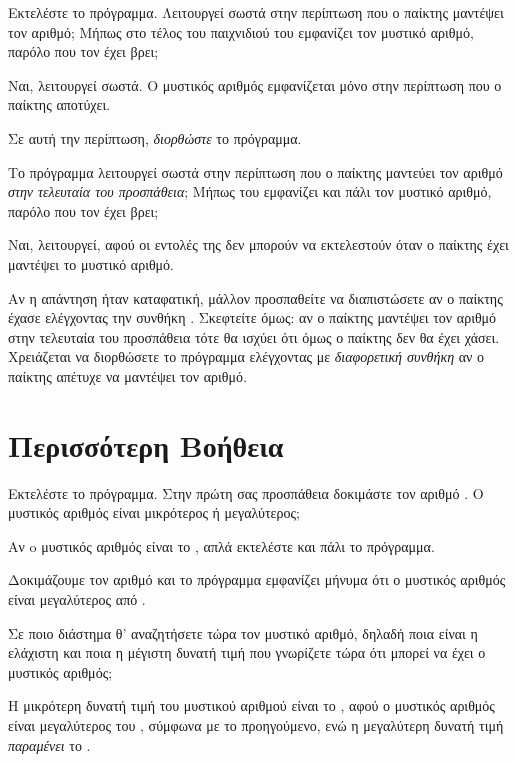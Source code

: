 \documentclass[a4paper,11pt,oneside]{book}
\begin{document}
\begin{step}
Εκτελέστε το πρόγραμμα. Λειτουργεί σωστά στην περίπτωση που ο παίκτης μαντέψει τον αριθμό; Μήπως στο τέλος του παιχνιδιού του εμφανίζει τον μυστικό αριθμό, παρόλο που τον έχει βρει;

\begin{answer}
	Ναι, λειτουργεί σωστά. Ο μυστικός αριθμός εμφανίζεται μόνο στην περίπτωση που ο παίκτης αποτύχει.
\end{answer}

Σε αυτή την περίπτωση, \emph{διορθώστε} το πρόγραμμα.

Tο πρόγραμμα λειτουργεί σωστά στην περίπτωση που ο παίκτης μαντεύει τον αριθμό \emph{στην τελευταία του προσπάθεια}; Μήπως του εμφανίζει και πάλι τον μυστικό αριθμό, παρόλο που τον έχει βρει;

\begin{answer}
	Ναι, λειτουργεί, αφού οι εντολές της  δεν μπορούν να εκτελεστούν όταν ο παίκτης έχει μαντέψει το μυστικό αριθμό.
\end{answer}

Αν η απάντηση ήταν καταφατική, μάλλον προσπαθείτε να διαπιστώσετε αν ο παίκτης έχασε ελέγχοντας την συνθήκη . Σκεφτείτε όμως: αν ο παίκτης μαντέψει τον αριθμό στην τελευταία του προσπάθεια τότε θα ισχύει ότι  όμως ο παίκτης δεν θα έχει χάσει. Χρειάζεται να διορθώσετε το πρόγραμμα ελέγχοντας με \emph{διαφορετική συνθήκη} αν ο παίκτης απέτυχε να μαντέψει τον αριθμό.
\end{step}

\section{Περισσότερη Βοήθεια}

\begin{step}
Εκτελέστε το πρόγραμμα. Στην πρώτη σας προσπάθεια δοκιμάστε τον αριθμό . Ο μυστικός αριθμός είναι μικρότερος ή μεγαλύτερος;

\begin{note}
Αν o μυστικός αριθμός είναι το , απλά εκτελέστε και πάλι το πρόγραμμα.
\end{note}

\begin{answer}
	Δοκιμάζουμε τον αριθμό  και το πρόγραμμα εμφανίζει μήνυμα ότι ο μυστικός αριθμός είναι μεγαλύτερος από .
\end{answer}

Σε ποιο διάστημα θ' αναζητήσετε τώρα τον μυστικό αριθμό, δηλαδή 
ποια είναι η ελάχιστη και ποια η μέγιστη δυνατή τιμή που γνωρίζετε τώρα ότι μπορεί να έχει ο μυστικός αριθμός;

\begin{answer}
Η μικρότερη δυνατή τιμή του μυστικού αριθμού είναι το , αφού ο μυστικός αριθμός είναι μεγαλύτερος του , σύμφωνα με το προηγούμενο, ενώ η μεγαλύτερη δυνατή τιμή \emph{παραμένει} το .
\end{answer}
\end{step}
\end{document}
